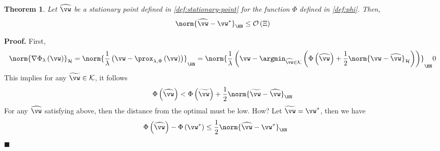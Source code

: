 \documentclass{article} %
\theoremstyle{plain}
\newtheorem{thm}{Theorem}
\theoremstyle{definition}
\theoremstyle{remark}
\newcommand{\ccref}[1]{\textcolor{black}{\cref{#1}}}
\begin{document}
	\begin{thm}
		\label{thm:stationary-point-is-good}
		Let $\widehat{\vw}$ be a stationary point defined in \ccref{def:stationary-point} for the function $\Phi$ defined in \ccref{def:phi}. Then, 
		\begin{equation}
			\norm{\widehat{\vw} - \vw^*}_{\HN} \leq \mathcal{O}\left(\Xi\right)
		\end{equation}
	\end{thm} 
	{\bf Proof.}
	First,
	\begin{equation}
		\norm{\nabla\Phi_{\lambda}\left(\vw\right)}_{\mathcal{H}}= \norm{\frac{1}{\lambda}\left(\vw - \prox_{\lambda,\Phi}\left(\vw\right)\right)}_{\HN} = \norm{\frac{1}{\lambda}\left(\vw - \argmin_{\widehat{\vw}\in\mathcal{K}}\left(\Phi\left(\widehat{\vw}\right) + \frac{1}{2}\norm{\vw - \widehat{\vw}}_{\mathcal{H}}\right)\right)}_{\HN} 0 
	\end{equation}
	This implies for any $\widetilde{\vw} \in \mathcal{K}$, it follows 
	\begin{equation}
		\Phi\left(\widehat{\vw}\right) < \Phi\left(\widetilde{\vw}\right) + \frac{1}{2}\norm{\widetilde{\vw} - \widehat{\vw}}_{\HN}
	\end{equation}
	For any $\widehat{\vw}$ satisfying above, then the distance from the optimal must be low. How?
	Let $\widetilde{\vw} = \vw^*$, then we have
	\begin{align}
		\Phi\left(\widehat{\vw}\right) - \Phi\left(\vw^*\right) &\leq \frac{1}{2}\norm{\widehat{\vw} - \vw^*}_{\HN} &&
	\end{align}
	\hfill $\blacksquare$
	
\end{document}
